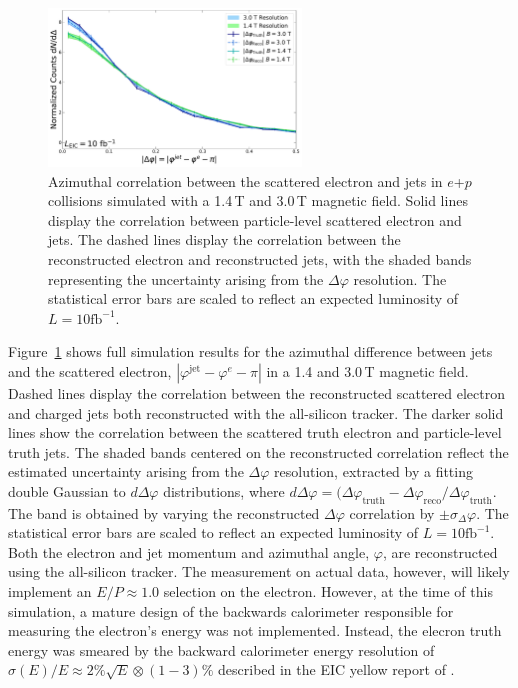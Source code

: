 \begin{figure}[htbp]
    \centering
\includegraphics[height=0.4\textwidth,width=0.6\textwidth]{EIC_Jets/azimuthal_correlations.pdf}
    \caption{Azimuthal correlation between the scattered electron and jets in $e$+$p$ collisions simulated with a 1.4\,T and 3.0\,T magnetic field. Solid lines display the correlation between particle-level scattered electron and jets. The dashed lines display the correlation between the reconstructed electron and reconstructed jets, with the shaded bands representing the uncertainty arising from the $\Delta\varphi$ resolution. The statistical error bars are scaled to reflect an expected luminosity of $L = 10\mathrm{fb}^{-1}$.}
    \label{fig:az_corr}
\end{figure}

Figure~\ref{fig:az_corr} shows full simulation results for the azimuthal difference between jets and the scattered electron, $|\varphi^\mathrm{jet} - \varphi^{e} - \pi|$ in a 1.4 and 3.0\,T magnetic field. Dashed lines display the correlation between the reconstructed scattered electron and charged jets both reconstructed with the all-silicon tracker. The darker solid lines show the correlation between the scattered truth electron and particle-level truth jets. The shaded bands centered on the reconstructed correlation reflect the estimated uncertainty arising from the $\Delta\varphi$ resolution, extracted by a fitting double Gaussian to $d\Delta\varphi$ distributions, where $d\Delta\varphi = (\Delta\varphi_\mathrm{truth}-\Delta\varphi_\mathrm{reco}/\Delta\varphi_\mathrm{truth}$. The band is obtained by varying the reconstructed $\Delta\varphi$ correlation by $\pm \sigma_\Delta\varphi$. The statistical error bars are scaled to reflect an expected luminosity of $L = 10\mathrm{fb}^{-1}$. Both the electron and jet momentum and azimuthal angle, $\varphi$, are reconstructed using the all-silicon tracker. The measurement on actual data, however, will likely implement an $E/P \approx 1.0$ selection on the electron. However, at the time of this simulation, a mature design of the backwards calorimeter responsible for measuring the electron's energy was not implemented. Instead, the elecron truth energy was smeared by the backward calorimeter energy resolution of $\sigma(E)/E\approx 2\%\sqrt{E}\otimes (1-3)\%$ described in the EIC yellow report of \cite{Khalek2021}.

